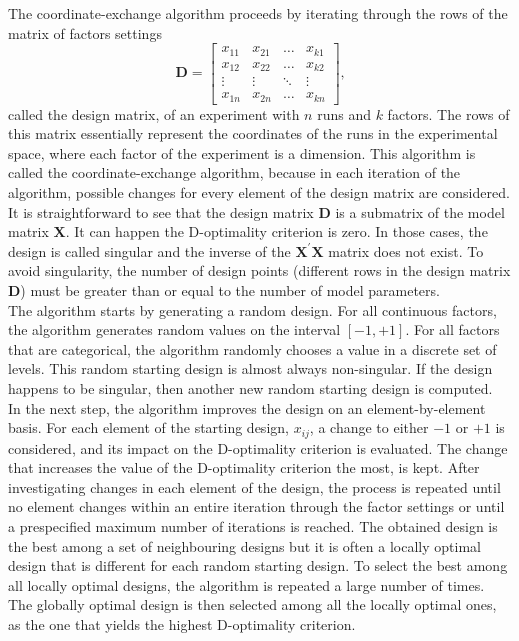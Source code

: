 The coordinate-exchange algorithm proceeds by iterating through the rows of the matrix of factors settings
\begin{equation}
\mathbf{D}= 
    \begin{bmatrix}
        x_{11} & x_{21} & \ldots & x_{k1} \\
        x_{12} & x_{22} & \ldots & x_{k2} \\
        \vdots & \vdots & \ddots & \vdots \\
        x_{1n} & x_{2n} & \ldots & x_{kn} 
    \end{bmatrix}
    \text{,}
    \label{mat:design_matrix}
\end{equation}
called the design matrix, of an experiment with $n$ runs and $k$ factors. The rows of this matrix essentially represent the 
coordinates of the runs in the experimental space, where each factor of the experiment is a dimension. This algorithm is called 
the coordinate-exchange algorithm, because in each iteration of the algorithm, possible changes for every element of the design 
matrix are considered. \\
It is straightforward to see that the design matrix $\mathbf{D}$ is a submatrix of the model matrix $\mathbf{X}$. It can happen 
the D-optimality criterion is zero. In those cases, the design is called singular and the inverse of the $\mathbf{X}^{\prime}
\mathbf{X}$ matrix does not exist. To avoid singularity, the number of design points (different rows in the design matrix $
\mathbf{D}$) must be greater than or equal to the number of model parameters.\\

The algorithm starts by generating a random design. For all continuous factors, the algorithm generates random values on the 
interval $[-1,+1]$. For all factors that are categorical, the algorithm randomly chooses a value in a discrete set of levels. 
This random starting design is almost always non-singular. If the design happens to be singular, then another new random 
starting design is computed.\\

In the next step, the algorithm improves the design on an element-by-element basis. For each element of the starting design, 
$x_{ij}$, a change to either $-1$ or $+1$ is considered, and its impact on the D-optimality criterion is evaluated. The change 
that increases the value of the D-optimality criterion the most, is kept. After investigating changes in each element of the 
design, the process is repeated until no element changes within an entire iteration through the factor settings or until a 
prespecified maximum number of iterations is reached. The obtained design is the best among a set of neighbouring designs but it 
is often a locally optimal design that is different for each random starting design. To select the best among all locally 
optimal designs, the algorithm is repeated a large number of times. The globally optimal design is then selected among all the 
locally optimal ones, as the one that yields the highest D-optimality criterion.

